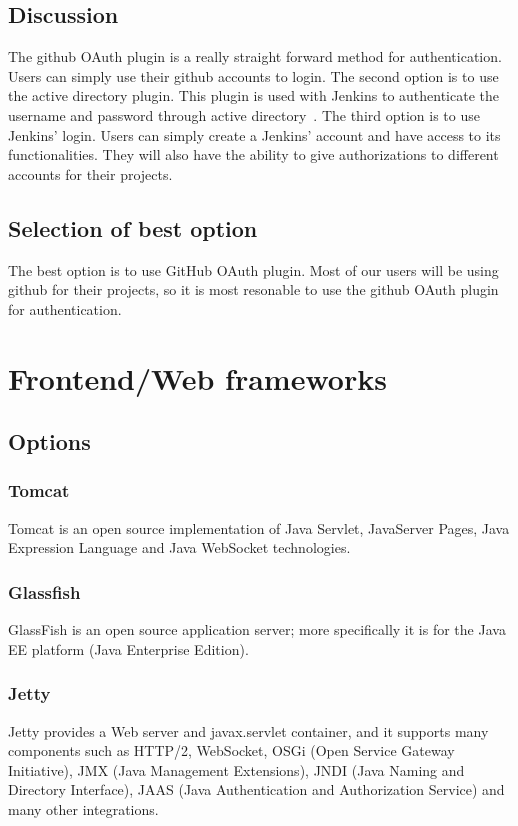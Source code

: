 \documentclass[10pt,letterpaper,onecolumn,journal]{IEEEtran}
\begin{document}
\subsection{Discussion}
The github OAuth plugin is a really straight forward method for authentication.
Users can simply use their github accounts to login.
The second option is to use the active directory plugin.
This plugin is used with Jenkins to authenticate the username and password through active directory~\cite{activedirectory}.
The third option is to use Jenkins’ login.
Users can simply create a Jenkins’ account and have access to its functionalities.
They will also have the ability to give authorizations to different accounts for their projects.
\subsection{Selection of best option}
The best option is to use GitHub OAuth plugin.
Most of our users will be using github for their projects, so it is most resonable to use the github OAuth plugin for authentication.

\section{Frontend/Web frameworks}
\subsection{Options}
\subsubsection{Tomcat}
Tomcat is an open source implementation of Java Servlet, JavaServer Pages, Java Expression Language and Java WebSocket technologies. 
\subsubsection{Glassfish}
GlassFish is an open source application server; more specifically it is for the Java EE platform (Java Enterprise Edition).
\subsubsection{Jetty}
Jetty provides a Web server and javax.servlet container, and it supports many components such as HTTP/2, WebSocket, OSGi (Open Service Gateway Initiative), JMX (Java Management Extensions), JNDI (Java Naming and Directory Interface), JAAS (Java Authentication and Authorization Service) and many other integrations.
\end{document}
